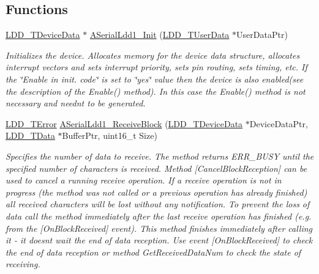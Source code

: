 \subsection*{Functions}
\begin{DoxyCompactItemize}
\item 
\hyperlink{group___p_e___types__module_gac5cf1362f1f0e3a2ce71b1bf2276d091}{L\+D\+D\+\_\+\+T\+Device\+Data} $\ast$ \hyperlink{group___a_serial_ldd1__module_ga72a2988ac3b4e592eb9dd9c9cf0db38f}{A\+Serial\+Ldd1\+\_\+\+Init} (\hyperlink{group___p_e___types__module_ga0b66a73f87238a782318aa0be7578e35}{L\+D\+D\+\_\+\+T\+User\+Data} $\ast$User\+Data\+Ptr)
\begin{DoxyCompactList}\small\item\em Initializes the device. Allocates memory for the device data structure, allocates interrupt vectors and sets interrupt priority, sets pin routing, sets timing, etc. If the \char`\"{}\+Enable
    in init. code\char`\"{} is set to \char`\"{}yes\char`\"{} value then the device is also enabled(see the description of the Enable() method). In this case the Enable() method is not necessary and needn\textquotesingle{}t to be generated. \end{DoxyCompactList}\item 
\hyperlink{group___p_e___types__module_ga24c2b045fd04e79e85f261ce4df35588}{L\+D\+D\+\_\+\+T\+Error} \hyperlink{group___a_serial_ldd1__module_gad445e8cc518c6e88fc212bd6d4e06490}{A\+Serial\+Ldd1\+\_\+\+Receive\+Block} (\hyperlink{group___p_e___types__module_gac5cf1362f1f0e3a2ce71b1bf2276d091}{L\+D\+D\+\_\+\+T\+Device\+Data} $\ast$Device\+Data\+Ptr, \hyperlink{group___p_e___types__module_gade8ef9401405bd941b6da738b807f980}{L\+D\+D\+\_\+\+T\+Data} $\ast$Buffer\+Ptr, uint16\+\_\+t Size)
\begin{DoxyCompactList}\small\item\em Specifies the number of data to receive. The method returns E\+R\+R\+\_\+\+B\+U\+SY until the specified number of characters is received. Method \mbox{[}Cancel\+Block\+Reception\mbox{]} can be used to cancel a running receive operation. If a receive operation is not in progress (the method was not called or a previous operation has already finished) all received characters will be lost without any notification. To prevent the loss of data call the method immediately after the last receive operation has finished (e.\+g. from the \mbox{[}On\+Block\+Received\mbox{]} event). This method finishes immediately after calling it -\/ it doesn\textquotesingle{}t wait the end of data reception. Use event \mbox{[}On\+Block\+Received\mbox{]} to check the end of data reception or method Get\+Received\+Data\+Num to check the state of receiving. \end{DoxyCompactList}\item 

\end{DoxyCompactItemize}
